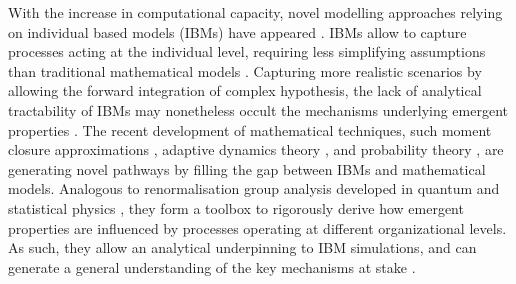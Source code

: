 With the increase in computational capacity, novel modelling approaches relying on individual based models (IBMs) have appeared \cite{deangelis2005individual}. IBMs allow to capture processes acting at the individual level, requiring less simplifying assumptions than traditional mathematical models \cite{deangelis2005individual}. Capturing more realistic scenarios by allowing the forward integration of complex hypothesis, the lack of analytical tractability of IBMs may nonetheless occult the mechanisms underlying emergent properties \cite{Lion2016}.
% 
The recent development of mathematical techniques, such moment closure approximations \cite{law1999moment,Gandhi2000,Nordbotten2020,Lion2016}, adaptive dynamics theory \cite{Metz1995}, and probability theory \cite{Champagnat2006}, are generating novel pathways by filling the gap between IBMs and mathematical models. 
% 
% 
Analogous to renormalisation group analysis developed in quantum and statistical physics \cite{Sayama}, they form a toolbox to rigorously derive how emergent properties are influenced by processes operating at different organizational levels. As such, they allow an analytical underpinning to IBM simulations, and can generate a general understanding of the key mechanisms at stake \cite{Lion2016}.

